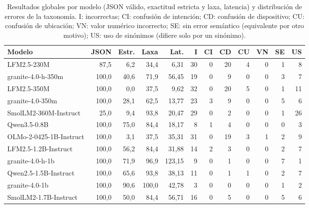\begin{table}[htbp]
\centering
\caption{Resultados globales por modelo (JSON válido, exactitud estricta y laxa, latencia) y distribución de errores de la taxonomía. I: incorrectas; CI: confusión de intención; CD: confusión de dispositivo; CU: confusión de ubicación; VN: valor numérico incorrecto; SE: sin error semántico (equivalente por otro motivo); US: uso de sinónimos (difiere solo por un sinónimo).}
\label{tab:resultados}
{\setlength{\tabcolsep}{2pt}
{\footnotesize
\begin{tabular}{lrrrrrrrrrrr}
\toprule
Modelo & JSON & Estr. & Laxa & Lat. & I & CI & CD & CU & VN & SE & US \\
\midrule
LFM2.5-230M & 87,5 & 6,2 & 34,4 & 6,31 & 30 & 0 & 20 & 4 & 0 & 1 & 8 \\
granite-4.0-h-350m & 100,0 & 40,6 & 71,9 & 56,45 & 19 & 0 & 9 & 0 & 0 & 3 & 7 \\
LFM2.5-350M & 100,0 & 0,0 & 37,5 & 9,62 & 32 & 0 & 20 & 5 & 0 & 1 & 11 \\
granite-4.0-350m & 100,0 & 28,1 & 62,5 & 13,77 & 23 & 3 & 9 & 0 & 0 & 5 & 6 \\
SmolLM2-360M-Instruct & 25,0 & 9,4 & 93,8 & 20,47 & 29 & 0 & 2 & 0 & 0 & 1 & 26 \\
Qwen3.5-0.8B & 100,0 & 75,0 & 84,4 & 18,17 & 8 & 1 & 4 & 0 & 0 & 0 & 3 \\
OLMo-2-0425-1B-Instruct & 100,0 & 3,1 & 37,5 & 35,31 & 31 & 0 & 19 & 3 & 1 & 2 & 9 \\
LFM2.5-1.2B-Instruct & 100,0 & 56,2 & 84,4 & 31,88 & 14 & 2 & 3 & 0 & 0 & 2 & 7 \\
granite-4.0-h-1b & 100,0 & 71,9 & 96,9 & 123,15 & 9 & 0 & 1 & 0 & 0 & 7 & 1 \\
Qwen2.5-1.5B-Instruct & 100,0 & 65,6 & 93,8 & 38,13 & 11 & 0 & 1 & 1 & 0 & 2 & 7 \\
granite-4.0-1b & 100,0 & 90,6 & 100,0 & 42,78 & 3 & 0 & 0 & 0 & 0 & 1 & 2 \\
SmolLM2-1.7B-Instruct & 100,0 & 50,0 & 84,4 & 56,71 & 16 & 0 & 5 & 0 & 0 & 5 & 6 \\
\bottomrule
\end{tabular}
}
}
\end{table}
